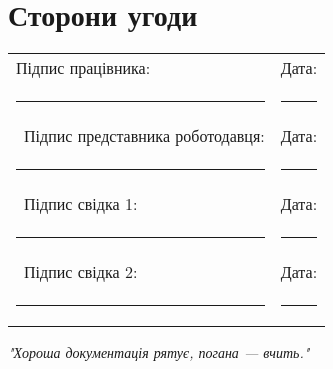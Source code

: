 \documentclass[a4paper,11pt]{article}
\begin{document}
\section*{Сторони угоди}

\vspace{2em}
\noindent\begin{tabular}{@{}p{8cm}p{8cm}@{}}
Підпис працівника: & Дата: \\
\rule{8cm}{0.4pt} & \rule{8cm}{0.4pt} \\\
Підпис представника роботодавця: & Дата: \\
\rule{8cm}{0.4pt} & \rule{8cm}{0.4pt} \\\
Підпис свідка 1: & Дата: \\
\rule{8cm}{0.4pt} & \rule{8cm}{0.4pt} \\\
Підпис свідка 2: & Дата: \\
\rule{8cm}{0.4pt} & \rule{8cm}{0.4pt}
\end{tabular}

\vfill

\begin{center}
    \textit{"Хороша документація рятує, погана — вчить."}
\end{center}
\end{document}

